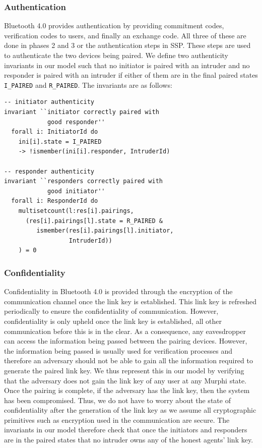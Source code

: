 \documentclass{acm_proc_article-sp}
\begin{document}
\subsubsection{Authentication}
Bluetooth 4.0 provides authentication by providing commitment codes, verification codes to users, and finally an exchange code. All three of these are done in phases 2 and 3 or the authentication steps in SSP. These steps are used to authenticate the two devices being paired. We define two authenticity invariants in our model such that no initiator is paired with an intruder and no responder is paired with an intruder if either of them are in the final paired states \texttt{I\_PAIRED} and \texttt{R\_PAIRED}. The invariants are as follows:

\begin{verbatim}
-- initiator authenticity
invariant ``initiator correctly paired with 
            good responder''
  forall i: InitiatorId do
    ini[i].state = I_PAIRED 
    -> !ismember(ini[i].responder, IntruderId)

-- responder authenticity
invariant ``responders correctly paired with 
            good initiator''
  forall i: ResponderId do
    multisetcount(l:res[i].pairings, 
      (res[i].pairings[l].state = R_PAIRED &
         ismember(res[i].pairings[l].initiator,
                  IntruderId))
    ) = 0
\end{verbatim}

\subsubsection{Confidentiality}
Confidentiality in Bluetooth 4.0 is provided through the encryption of the communication channel once the link key is established. This link key is refreshed periodically to ensure the confidentiality of communication. However, confidentiality is only upheld once the link key is established, all other communication before this is in the clear. As a consequence, any eavesdropper can access the information being passed between the pairing devices. However, the information being passed is usually used for verification processes and therefore an adversary should not be able to gain all the information required to generate the paired link key. We thus represent this in our model by verifying that the adversary does not gain the link key of any user at any Murphi state. Once the pairing is complete, if the adversary has the link key, then the system has been compromised. Thus, we do not have to worry about the state of confidentiality after the generation of the link key as we assume all cryptographic primitives such as encryption used in the communication are secure. The invariants in our model therefore check that once the initiators and responders are in the paired states that no intruder owns any of the honest agents' link key.
\end{document}

